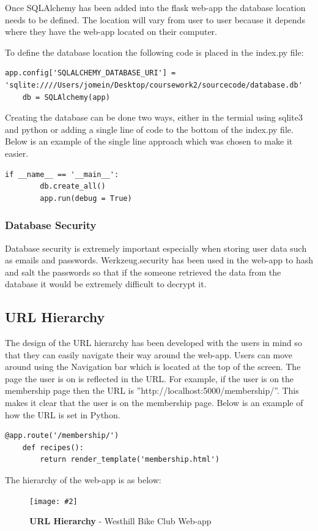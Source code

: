 \documentclass[10pt, a4paper]{article}
\newcommand{\figuremacro}[5]{
    \begin{figure}[#1]
        \centering
        \texttt{[image: \#2]}
        \caption[#3]{\textbf{#3}#4}
        \label{fig:#2}
    \end{figure}
}
\begin{document}
    Once SQLAlchemy has been added into the flask web-app the database location needs to be defined. The location will vary from user to user because it depends where they have the web-app located on their computer. 
    
    To define the database location the following code is placed in the index.py file:
    \begin{lstlisting}[caption = Defining Database Location]
    app.config['SQLALCHEMY_DATABASE_URI'] = 'sqlite:////Users/jomein/Desktop/coursework2/sourcecode/database.db'
    db = SQLAlchemy(app)\end{lstlisting}
    
    Creating the database can be done two ways, either in the termial using sqlite3 and python or adding a single line of code to the bottom of the index.py file. Below is an example of the single line approach which was chosen to make it easier.
    
    \begin{lstlisting}[caption = db.Create\_all()]
    if __name__ == '__main__':
        db.create_all()
        app.run(debug = True)\end{lstlisting}
    
    \subsubsection{Database Security}
    Database security is extremely important especially when storing user data such as emails and passwords. Werkzeug.security has been used in the web-app to hash and salt the passwords so that if the someone retrieved the data from the database it would be extremely difficult to decrypt it. 

	\subsection{URL Hierarchy}
	The design of the URL hierarchy has been developed with the users in mind so that they can easily navigate their way around the web-app. Users can move around using the Navigation bar which is located at the top of the screen. The page the user is on is reflected in the URL. For example, if the user is on the membership page then the URL is ''http://localhost:5000/membership/''. This makes it clear that the user is on the membership page. Below is an example of how the URL is set in Python.
	\begin{lstlisting}[caption = Recipes URL Hierarchy in Python Flask]
    @app.route('/membership/')
    def recipes():
        return render_template('membership.html')
    \end{lstlisting}
	The hierarchy of the web-app is as below:  
	\figuremacro{h}{URL_Hierarchy_CW2}{URL Hierarchy}{ - Westhill Bike Club Web-app }{1.0}
	
\end{document}
